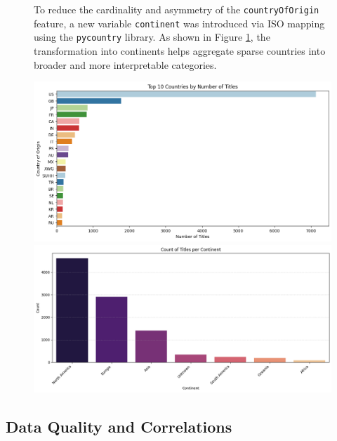 \documentclass[10pt]{article}
\begin{document}
\begin{figure}[H]
\begin{minipage}{0.45\textwidth}
        \vspace{2mm}
                To reduce the cardinality and asymmetry of the \texttt{countryOfOrigin} feature, a new variable \texttt{continent} was introduced via ISO mapping using the \texttt{pycountry} library.
                As shown in Figure \ref{fig:continent}, the transformation into continents helps aggregate sparse countries into broader and more interpretable categories.
    \end{minipage}
    \hfill
    \begin{minipage}{0.5\textwidth}
        \centering
        \includegraphics[width=0.9\linewidth]{country.png}
        {\footnotesize {}\label{fig:country}}
        \vspace{0.5cm}
        \includegraphics[width=0.9\linewidth]{continent.png}
        {\footnotesize {}\label{fig:continent}}
    \end{minipage}
\end{figure}



\subsection{Data Quality and Correlations}
\end{document}
